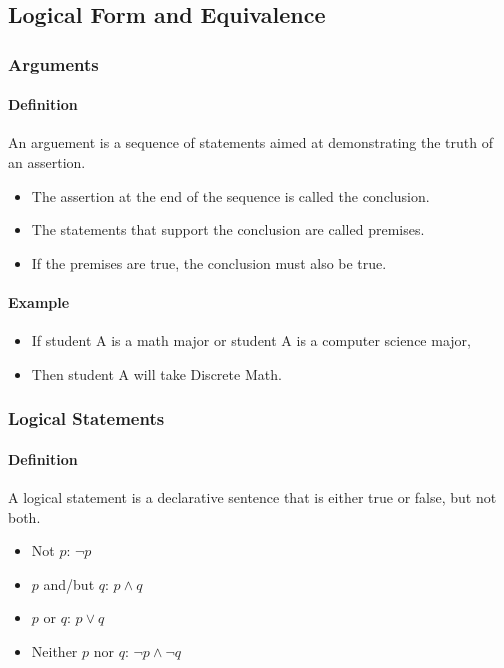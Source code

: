 \subsection{Logical Form and Equivalence}
\hrulefill
\subsubsection*{Arguments}

\paragraph*{Definition}
An arguement is a sequence of statements aimed at demonstrating the truth of an assertion.
\begin{itemize}
    \item The assertion at the end of the sequence is called the conclusion.
    \item The statements that support the conclusion are called premises.
    \item If the premises are true, the conclusion must also be true.
\end{itemize}

\paragraph*{Example}
\begin{itemize}
    \item If student A is a math major or student A is a computer science major,
    \item Then student A will take Discrete Math.
\end{itemize}

\subsubsection*{Logical Statements}
\paragraph*{Definition}
A logical statement is a declarative sentence that is either true or false, but not both.\\
\begin{itemize}
    \item Not $p$: \quad $\neg p$
    \item $p$ and/but $q$: \quad $p \land q$
    \item $p$ or $q$: \quad $p \lor q$
    \item Neither $p$ nor $q$: \quad $\neg p \land \neg q$
\end{itemize}

